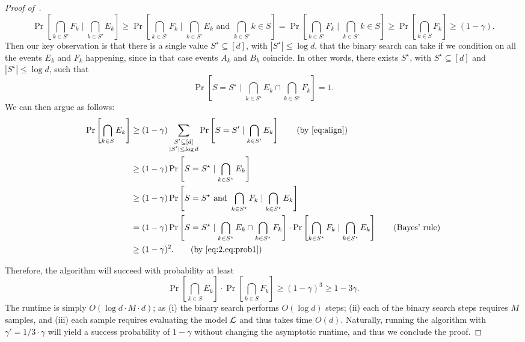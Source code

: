 \begin{proof}[Proof of~]
\begin{equation}
	\Pr\left[\bigcap_{k \in S'} F_k \mid \bigcap_{k \in S'} E_k\right] \geq  \Pr\left[\bigcap_{k \in S'} F_k \mid \bigcap_{k \in S'} E_k \text{ and  } \bigcap_{k \in S'} {k \in S}\right] = \Pr\left[\bigcap_{k \in S'} F_k \mid \bigcap_{k \in S'} {k \in S}\right] \geq \Pr\left[\bigcap_{k \in S} F_k\right] \geq (1-\gamma).
\end{equation}
Then our key observation is that there is a single value $S^\star \subseteq [d]$, with $|S^\star| \leq \log d$, that the binary search can take if we condition on all the events $E_k$ and $F_k$ happening, since in that case events $A_k$ and $B_k$ coincide. In other words, there exists $S^\star$, with $S^\star \subseteq [d]$ and $|S^\star| \leq \log d$, such that
\begin{equation}\label{eq:prob1}
\Pr\left[S = S^\star \mid \bigcap_{k \in S^\star} E_k \cap \bigcap_{k \in S^\star} F_k\right] = 1.
\end{equation}
We can then argue as follows:
\begin{align*}
	\Pr\left[\bigcap_{k \in S} E_k\right] &\geq (1-\gamma) \sum_{\substack{S' \subseteq [d]\\ |S'| \leq \log d}} \Pr\left[S = S' \mid \bigcap_{k \in S'} E_k\right]\tag{by~\Cref{eq:align}}\\
	&\geq (1-\gamma) \Pr\left[S = S^\star  \mid \bigcap_{k \in S^\star} E_k \right]\\
	&\geq (1-\gamma) \Pr\left[S = S^\star \text{ and } \bigcap_{k \in S^\star} F_k \mid \bigcap_{k \in S^\star} E_k \right]\\
	&= (1-\gamma) \Pr\left[S = S^\star \mid \bigcap_{k \in S^\star} E_k \cap \bigcap_{k \in S^\star} F_k\right] \cdot \Pr\left[\bigcap_{k \in S^\star} F_k \mid \bigcap_{k \in S^\star} E_k\right]\tag{Bayes' rule}\\
	&\geq (1-\gamma)^2. \tag{by~\Cref{eq:2,eq:prob1}}
\end{align*}


Therefore, the algorithm will succeed with probability at least 
\[ 
	\Pr\left[\bigcap_{k \in S} E_k\right] \cdot \Pr\left[\bigcap_{k \in S} F_k\right] \geq (1-\gamma)^3 \geq 1-3\gamma.
\]
The runtime is simply
$O(\log d \cdot M \cdot d  )$; as (i) the binary search performs $O(\log d)$ steps; (ii) each of the binary search steps requires $M$ samples, and (iii) each sample requires evaluating the model $\mathcal{L}$ and thus takes time $O(d)$. Naturally, running the algorithm with $\gamma' = 1/3 \cdot \gamma$ will yield a success probability of $1-\gamma$ without changing the asymptotic runtime, and thus we conclude the proof.



\end{proof}
